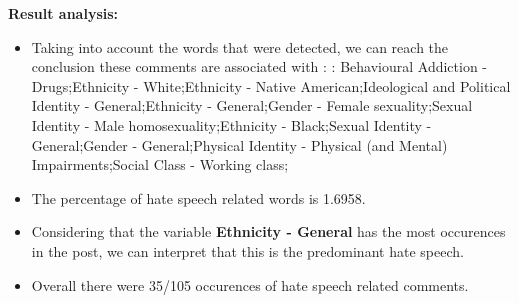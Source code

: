\documentclass[11pt]{article}
\newlength\mylength
\begin{document}
\begin{center}
\begin{longtable}{|C{.50\mylength}|C{.30\mylength}|C{.15\mylength}|C{.15\mylength}|C{.15\mylength}|}
\end{longtable}
\end{center}


\textbf{\Large Result analysis:}

\begin{itemize}\item Taking into account the words that were detected, we can reach the conclusion these comments are associated with : : Behavioural Addiction - Drugs;Ethnicity - White;Ethnicity - Native American;Ideological and Political Identity - General;Ethnicity - General;Gender - Female sexuality;Sexual Identity - Male homosexuality;Ethnicity - Black;Sexual Identity - General;Gender - General;Physical Identity - Physical (and Mental) Impairments;Social Class - Working class;%

\item The percentage of hate speech related words is 1.6958.

\item Considering that the variable \textbf{Ethnicity - General} has the most occurences in the post, we can interpret that this is the predominant hate speech.

\item Overall there were 35/105 occurences of hate speech related comments.\end{itemize}
\end{document}
